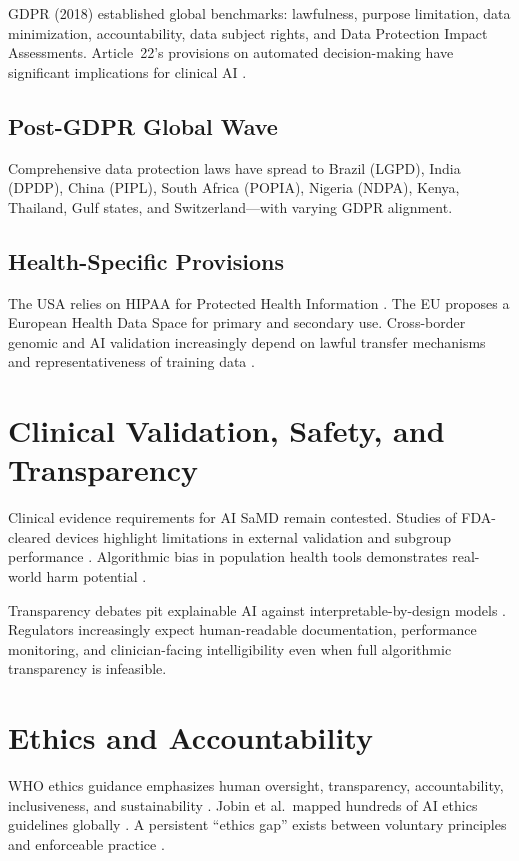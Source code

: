 \documentclass[12pt,a4paper]{report}
\begin{document}
GDPR (2018) established global benchmarks: lawfulness, purpose limitation, data minimization, accountability, data subject rights, and Data Protection Impact Assessments. Article~22's provisions on automated decision-making have significant implications for clinical AI \cite{goodman2017}.

\subsection{Post-GDPR Global Wave}

Comprehensive data protection laws have spread to Brazil (LGPD), India (DPDP), China (PIPL), South Africa (POPIA), Nigeria (NDPA), Kenya, Thailand, Gulf states, and Switzerland---with varying GDPR alignment.

\subsection{Health-Specific Provisions}

The USA relies on HIPAA for Protected Health Information \cite{cohen2018}. The EU proposes a European Health Data Space for primary and secondary use. Cross-border genomic and AI validation increasingly depend on lawful transfer mechanisms and representativeness of training data \cite{gerke2020}.

\section{Clinical Validation, Safety, and Transparency}

Clinical evidence requirements for AI SaMD remain contested. Studies of FDA-cleared devices highlight limitations in external validation and subgroup performance \cite{wu2021}. Algorithmic bias in population health tools demonstrates real-world harm potential \cite{obermeyer2019,seyedkalantari2021}.

Transparency debates pit explainable AI against interpretable-by-design models \cite{ghassemi2021,rudin2019}. Regulators increasingly expect human-readable documentation, performance monitoring, and clinician-facing intelligibility even when full algorithmic transparency is infeasible.

\section{Ethics and Accountability}

WHO ethics guidance emphasizes human oversight, transparency, accountability, inclusiveness, and sustainability \cite{who2021}. Jobin et al.\ mapped hundreds of AI ethics guidelines globally \cite{jobin2019}. A persistent ``ethics gap'' exists between voluntary principles and enforceable practice \cite{mittelstadt2019,morley2020}.
\end{document}
